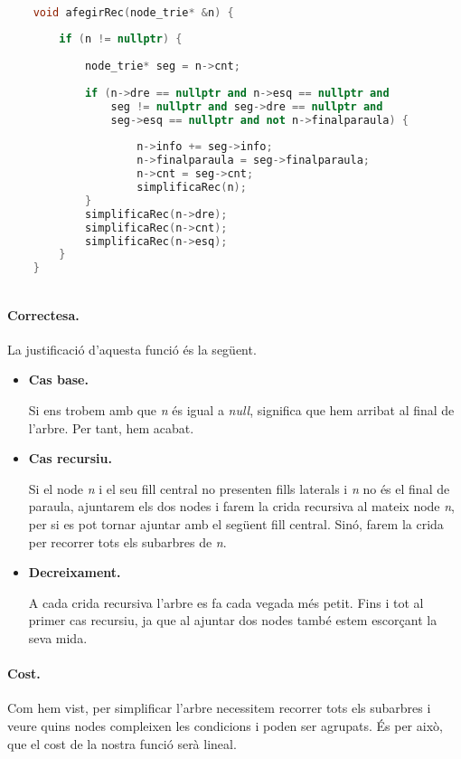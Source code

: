 \documentclass[titlepage]{article}
\begin{document}
\begin{lstlisting}[language=C++]

    void afegirRec(node_trie* &n) {
    
        if (n != nullptr) {
        
            node_trie* seg = n->cnt;
            
            if (n->dre == nullptr and n->esq == nullptr and 
                seg != nullptr and seg->dre == nullptr and 
                seg->esq == nullptr and not n->finalparaula) {
            
                    n->info += seg->info;
                    n->finalparaula = seg->finalparaula;
                    n->cnt = seg->cnt;
                    simplificaRec(n);
            }
            simplificaRec(n->dre);
            simplificaRec(n->cnt);
            simplificaRec(n->esq);
        }
    }
    
\end{lstlisting}

\paragraph{Correctesa.} La justificació d'aquesta funció és la següent.

\begin{itemize}
    \item \textbf{Cas base.}\par
    Si ens trobem amb que \textit{n} és igual a \textit{null}, significa que hem arribat al final de l'arbre. Per tant, hem acabat.
    \item \textbf{Cas recursiu.}\par
    Si el node \textit{n} i el seu fill central no presenten fills laterals i \textit{n} no és el final de paraula, ajuntarem els dos nodes i farem la crida recursiva al mateix node \textit{n}, per si es pot tornar ajuntar amb el següent fill central.
    Sinó, farem la crida per recorrer tots els subarbres de \textit{n}.
    \item \textbf{Decreixament.}\par
    A cada crida recursiva l'arbre es fa cada vegada més petit. Fins i tot al primer cas recursiu, ja que al ajuntar dos nodes també estem escorçant la seva mida.
\end{itemize}

\paragraph{Cost.} Com hem vist, per simplificar l'arbre necessitem recorrer tots els subarbres i veure quins nodes compleixen les condicions i poden ser agrupats. És per això, que el cost de la nostra funció serà lineal.
\end{document}
